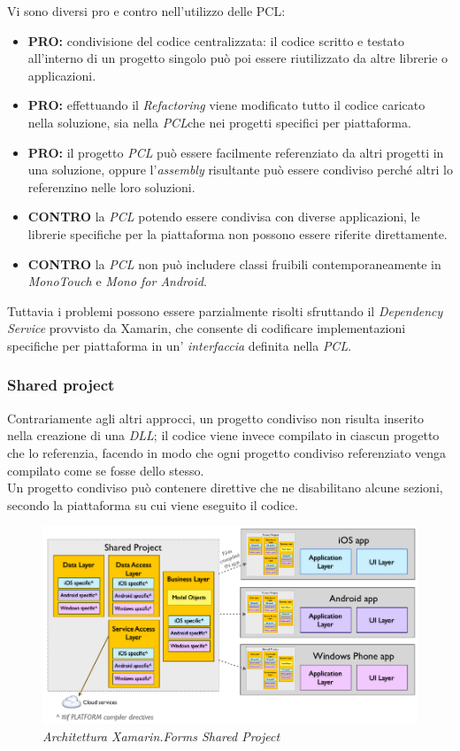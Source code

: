 Vi sono diversi pro e contro nell'utilizzo delle PCL:
\begin{itemize}
	\item \textbf{PRO:} condivisione del codice centralizzata: il codice scritto e testato all'interno di un progetto singolo può poi essere riutilizzato da altre librerie o applicazioni.
	\item \textbf{PRO:} effettuando il \textit{Refactoring} viene modificato tutto il codice caricato nella soluzione, sia nella \textit{PCL}che nei progetti specifici per piattaforma.
	\item \textbf{PRO:} il progetto \textit{PCL} può essere facilmente referenziato da altri progetti in una soluzione, oppure l'\textit{assembly} risultante può essere condiviso perché altri lo referenzino nelle loro soluzioni.
	\item \textbf{CONTRO} la \textit{PCL} potendo essere condivisa con diverse applicazioni, le librerie specifiche per la piattaforma non possono essere riferite direttamente.
	\item \textbf{CONTRO} la \textit{PCL} non può includere classi fruibili contemporaneamente in \textit{MonoTouch} e \textit{Mono for Android}. 
\end{itemize}
Tuttavia i problemi possono essere parzialmente risolti sfruttando il \textit{Dependency Service} provvisto da Xamarin, che consente di codificare implementazioni specifiche per piattaforma in un' \textit{interfaccia} definita nella \textit{PCL}.
\subsubsection{Shared project}
Contrariamente agli altri approcci, un progetto condiviso non risulta inserito nella creazione di una \textit{DLL}; il codice viene invece compilato in ciascun progetto che lo referenzia, facendo in modo che ogni progetto condiviso referenziato venga compilato come se fosse dello stesso.
\\
Un progetto condiviso può contenere direttive che ne disabilitano alcune sezioni, secondo la piattaforma su cui viene eseguito il codice.

\begin{figure}[ht]
	\centering
	\includegraphics[scale=0.39]{immagini/progettazione/SharedAssetProject.png}
	\caption{\textit{Architettura Xamarin.Forms Shared Project}}
\end{figure}\FloatBarrier


